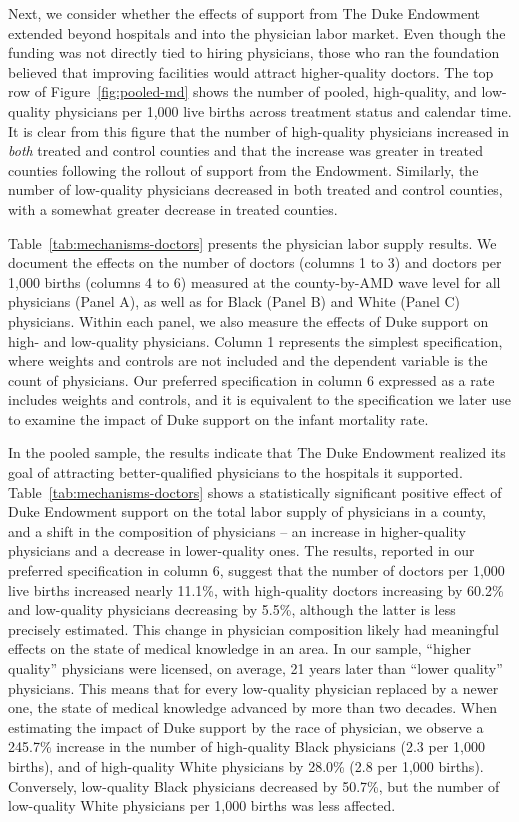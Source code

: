 \documentclass[12pt]{article}
\begin{document}
Next, we consider whether the effects of support from The Duke Endowment extended beyond hospitals and into the physician labor market.
Even though the funding was not directly tied to hiring physicians, those who ran the foundation believed that improving facilities would attract higher-quality doctors. 
The top row of Figure~\ref{fig:pooled-md} shows the number of pooled, high-quality, and low-quality physicians per 1,000 live births across treatment status and calendar time. 
It is clear from this figure that the number of high-quality physicians increased in \emph{both} treated and control counties and that the increase was greater in treated counties following the rollout of support from the Endowment. 
Similarly, the number of low-quality physicians decreased in both treated and control counties, with a somewhat greater decrease in treated counties.

Table~\ref{tab:mechanisms-doctors} presents the physician labor supply results. 
We document the effects on the number of doctors (columns 1 to 3) and doctors per 1,000 births (columns 4 to 6) measured at the county-by-AMD wave level for all physicians (Panel A), as well as for Black (Panel B) and White (Panel C) physicians. 
Within each panel, we also measure the effects of Duke support on high- and low-quality physicians. 
Column 1 represents the simplest specification, where weights and controls are not included and the dependent variable is the count of physicians. 
Our preferred specification in column 6 expressed as a rate includes weights and controls, and it is equivalent to the specification we later use to examine the impact of Duke support on the infant mortality rate. 

In the pooled sample, the results indicate that The Duke Endowment realized its goal of attracting better-qualified physicians to the hospitals it supported. 
Table~\ref{tab:mechanisms-doctors} shows a statistically significant positive effect of Duke Endowment support on the total labor supply of physicians in a county, and a shift in the composition of physicians – an increase in higher-quality physicians and a decrease in lower-quality ones. 
The results, reported in our preferred specification in column 6, suggest that the number of doctors per 1,000 live births increased nearly 11.1\%, with high-quality doctors increasing by 60.2\% and low-quality physicians decreasing by 5.5\%, although the latter is less precisely estimated. 
This change in physician composition likely had meaningful effects on the state of medical knowledge in an area. 
In our sample, ``higher quality'' physicians were licensed, on average, 21 years later than ``lower quality'' physicians. 
This means that for every low-quality physician replaced by a newer one, the state of medical knowledge advanced by more than two decades.
When estimating the impact of Duke support by the race of physician, we observe a 245.7\% increase in the number of high-quality Black physicians (2.3 per 1,000 births), and of high-quality White physicians by 28.0\% (2.8 per 1,000 births). 
Conversely, low-quality Black physicians decreased by 50.7\%, but the number of low-quality White physicians per 1,000 births was less affected.
\end{document}
